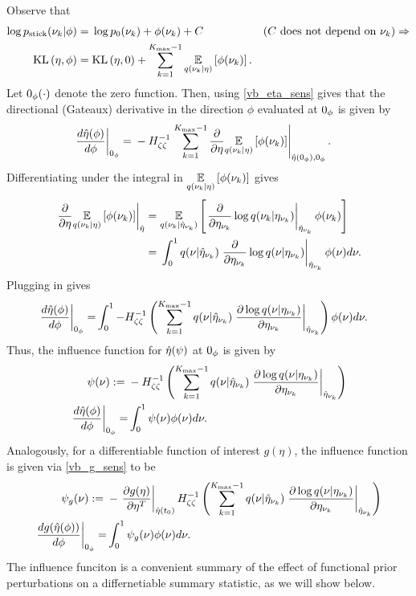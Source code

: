 Observe that
%
\begin{align*}
%
\log \pstick(\nuk \vert \phi) ={}&
    \log \pb(\nuk) + \phi(\nuk) + \const
    & \constdesc{\nuk} \Rightarrow\\
\KL{\eta, \phi} ={}&
    \KL{\eta, 0} + \sumkm \expect{\q(\nuk \vert \eta)}{\phi(\nuk)}.
%
\end{align*}
%
Let $0_\phi(\cdot)$ denote the zero function.  Then, using \eqref{vb_eta_sens}
gives that the directional (Gateaux) derivative in the direction $\phi$
evaluated at $0_\phi$ is given by
%
\begin{align*}
%
\fracat{d \etaopt(\phi)}{d \phi}{\phiz} ={}&
    - \hess{\zeta\zeta}^{-1}
    \evalat{
        \sumkm \frac{\partial}{\partial \eta}
            \expect{\q(\nuk \vert \eta)}{\phi(\nuk)}}
           {\etaopt(\phiz), \phiz}.
%
\end{align*}
%
Differentiating under the integral in $\underset{q(\nu_{k} \vert
\eta)}{\mathbb{E}}\left[\phi(\nu_{k})\right]$ gives
%
\begin{align*}
%
\evalat{
\frac{\partial}{\partial \eta}
    \expect{\q(\nuk \vert \eta)}{\phi(\nuk)}
}{\etaopt} ={}&
\expect{\q(\nuk \vert \etaoptnuk)}
       {\evalat{\frac{\partial}{\partial \etanuk}
                  \log\q(\nuk \vert \etanuk)}
                {\etaoptnuk}
        \phi(\nuk)} \\
={}&
\int_0^1
    \q(\nu \vert \etaoptnuk)
    \evalat{\frac{\partial}{\partial \etanuk}
               \log\q(\nu \vert \etanuk)}
             {\etaoptnuk}
    \phi(\nu) d\nu.
%
\end{align*}
%
Plugging in gives
%
\begin{align*}
%
\fracat{d \etaopt(\phi)}{d \phi}{\phiz} =&{}
    \int_0^1
    -\hess{\zeta\zeta}^{-1}
    \left(
        \sumkm
        \q(\nu \vert \etaoptnuk)
        \fracat{\partial \log\q(\nu \vert \etanuk)}
               {\partial \etanuk}
               {\etaoptnuk}
    \right) \phi(\nu) d\nu.
%
\end{align*}
%
Thus, the influence function for $\hat\eta(\psi)$ at $0_\phi$ is given by
%
\begin{align*}
%
\infl(\nu) :={}&
-\hess{\zeta\zeta}^{-1}
\left(
    \sumkm
    \q(\nu \vert \etaoptnuk)
    \fracat{\partial \log\q(\nu \vert \etanuk)}
           {\partial \etanuk}
           {\etaoptnuk}
\right) \\
\fracat{d \etaopt(\phi)}{d \phi}{\phiz} =&{}
    \int_0^1 \infl(\nu) \phi(\nu) d\nu.
%
\end{align*}
%
Analogously, for a differentiable function of interest $g(\eta)$,
the influence function is given via \eqref{vb_g_sens} to be
%
\begin{align*}
%
\inflg(\nu) :={}&
-\fracat{\partial g(\eta)}{\partial \eta^T}{\etaopt(\t_0)}
    \hess{\zeta\zeta}^{-1}
\left(
    \sumkm
    \q(\nu \vert \etaoptnuk)
    \fracat{\partial \log\q(\nu \vert \etanuk)}
           {\partial \etanuk}
           {\etaoptnuk}
\right) \\
\fracat{d g(\etaopt(\phi))}{d \phi}{\phiz} =&{}
    \int_0^1 \inflg(\nu) \phi(\nu) d\nu.
%
\end{align*}
%
The influence funciton is a convenient summary of the effect of
functional prior perturbations on a differnetiable summary statistic, as
we will show below.

